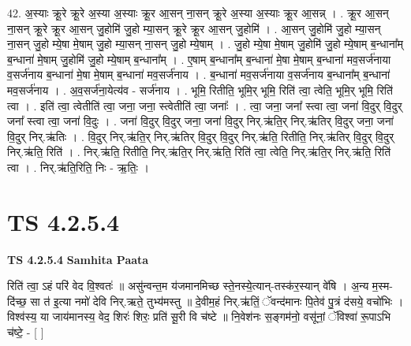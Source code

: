 \documentclass[17pt]{extarticle}
\begin{document}
42. अ॒स्याः क्रू॒रे क्रू॒रे अ॒स्या अ॒स्याः क्रू॒र आ॒सन् ना॒सन् क्रू॒रे अ॒स्या अ॒स्याः क्रू॒र आ॒सन्न् । . क्रू॒र आ॒सन् ना॒सन् क्रू॒रे क्रू॒र आ॒सन् जु॒होमि॑ जु॒हो म्या॒सन् क्रू॒रे क्रू॒र आ॒सन् जु॒होमि॑ । . आ॒सन् जु॒होमि॑ जु॒हो म्या॒सन् ना॒सन् जु॒हो म्ये॒षा मे॒षाम् जु॒हो म्या॒सन् ना॒सन् जु॒हो म्ये॒षाम् । . जु॒हो म्ये॒षा मे॒षाम् जु॒होमि॑ जु॒हो म्ये॒षाम् ब॒न्धाना᳚म् ब॒न्धाना॑ मे॒षाम् जु॒होमि॑ जु॒हो म्ये॒षाम् ब॒न्धाना᳚म् । . ए॒षाम् ब॒न्धाना᳚म् ब॒न्धाना॑ मे॒षा मे॒षाम् ब॒न्धाना॑ मव॒सर्ज॑नाया व॒सर्ज॑नाय ब॒न्धाना॑ मे॒षा मे॒षाम् ब॒न्धाना॑ मव॒सर्ज॑नाय । . ब॒न्धाना॑ मव॒सर्ज॑नाया व॒सर्ज॑नाय ब॒न्धाना᳚म् ब॒न्धाना॑ मव॒सर्ज॑नाय । . अ॒व॒सर्ज॑ना॒येत्य॑व - सर्ज॑नाय । . भूमि॒ रितीति॒ भूमि॒र् भूमि॒ रिति॑ त्वा॒ त्वेति॒ भूमि॒र् भूमि॒ रिति॑ त्वा । . इति॑ त्वा॒ त्वेतीति॑ त्वा॒ जना॒ जना॒ स्त्वेतीति॑ त्वा॒ जनाः᳚ । . त्वा॒ जना॒ जना᳚ स्त्वा त्वा॒ जना॑ वि॒दुर् वि॒दुर् जना᳚ स्त्वा त्वा॒ जना॑ वि॒दुः । . जना॑ वि॒दुर् वि॒दुर् जना॒ जना॑ वि॒दुर् निर्.ऋ॑ति॒र् निर्.ऋ॑तिर् वि॒दुर् जना॒ जना॑ वि॒दुर् निर्.ऋ॑तिः । . वि॒दुर् निर्.ऋ॑ति॒र् निर्.ऋ॑तिर् वि॒दुर् वि॒दुर् निर्.ऋ॑ति॒ रितीति॒ निर्.ऋ॑तिर् वि॒दुर् वि॒दुर् निर्.ऋ॑ति॒ रिति॑ । . निर्.ऋ॑ति॒ रितीति॒ निर्.ऋ॑ति॒र् निर्.ऋ॑ति॒ रिति॑ त्वा॒ त्वेति॒ निर्.ऋ॑ति॒र् निर्.ऋ॑ति॒ रिति॑ त्वा । . निर्.ऋ॑ति॒रिति॒ निः - ऋ॒तिः॒ । \newline
\pagebreak
{}

\section{ TS 4.2.5.4 }

\textbf{TS 4.2.5.4 } \newline
\textbf{Samhita Paata} \newline

रिति॑ त्वा॒ ऽहं परि॑ वेद वि॒श्वतः॑ ॥ असु॑न्वन्त॒म य॑जमानमिच्छ स्ते॒नस्ये॒त्यान्-तस्क॑र॒स्यान् वे॑षि । अ॒न्य म॒स्म-दि॑च्छ॒ सा त॑ इ॒त्या नमो॑ देवि निर्.ऋते॒ तुभ्य॑मस्तु ॥ दे॒वीम॒हं निर्.ऋ॑तिं॒ ॅवन्द॑मानः पि॒तेव॑ पु॒त्रं द॑सये॒ वचो॑भिः । विश्व॑स्य॒ या जाय॑मानस्य॒ वेद॒ शिरः॑ शिरः॒ प्रति॑ सू॒री वि च॑ष्टे ॥ नि॒वेश॑नः स॒ङ्गम॑नो॒ वसू॑नां॒ ॅविश्वा॑ रू॒पाऽभि च॑ष्टे॒ - [  ] \newline
\end{document}
